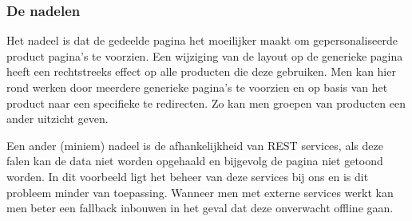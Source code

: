 \documentclass{article}
\begin{document}
	\subsubsection{De nadelen}
    Het nadeel is dat de gedeelde pagina het moeilijker maakt om gepersonaliseerde product pagina's te voorzien. Een wijziging van de layout op de generieke pagina heeft een rechtstreeks effect op alle producten die deze gebruiken. Men kan hier rond werken door meerdere generieke pagina's te voorzien en op basis van het product naar een specifieke te redirecten. Zo kan men groepen van producten een ander uitzicht geven.
    \par
    Een ander (miniem) nadeel is de afhankelijkheid van REST services, als deze falen kan de data niet worden opgehaald en bijgevolg de pagina niet getoond worden. In dit voorbeeld ligt het beheer van deze services bij ons en is dit probleem minder van toepassing. Wanneer men met externe services werkt kan men beter een fallback inbouwen in het geval dat deze onverwacht offline gaan.
\end{document}
